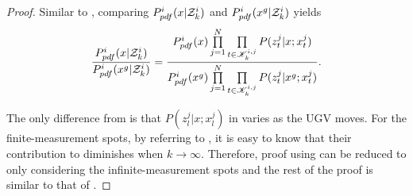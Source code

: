 	\begin{proof}		
		Similar to , comparing $P^i_{pdf}(x|\mathcal{Z}^i_k)$ and $P^i_{pdf}(x^g|\mathcal{Z}^i_k)$ yields		
		\small\begin{equation}\label{eqn:cmp2}
		\frac{P^i_{pdf}(x|\mathcal{Z}^i_k)}{P^i_{pdf}(x^g|\mathcal{Z}^i_k)}=\frac{P^i_{pdf}(x)\prod\limits_{j=1}^{N}\prod\limits_{t\in\mathscr{K}^{i,j}_{k}}P(z^j_t|x;x^j_t)}{P^i_{pdf}(x^g)\prod\limits_{j=1}^{N}\prod\limits_{t\in\mathscr{K}^{i,j}_{k}}P(z^j_t|x^g;x^j_t)}.
		\end{equation}\normalsize
			
		The only difference from  is that $P(z^j_l|x;x^j_l)$ in  varies as the UGV moves.
		For the finite-measurement spots, by referring to , it is easy to know that their contribution to  diminishes when $k\rightarrow \infty$.
		Therefore, proof using  can be reduced to only considering the infinite-measurement spots and the rest of the proof is similar to that of .
		
	\end{proof}
			
